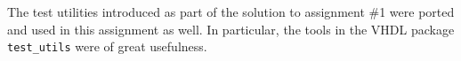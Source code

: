 The test utilities introduced as part of the solution to assignment \#1\cite{assignment-1} were ported and used in this assignment as well.
In particular, the tools in the VHDL package \texttt{test\_utils} were of great usefulness.
